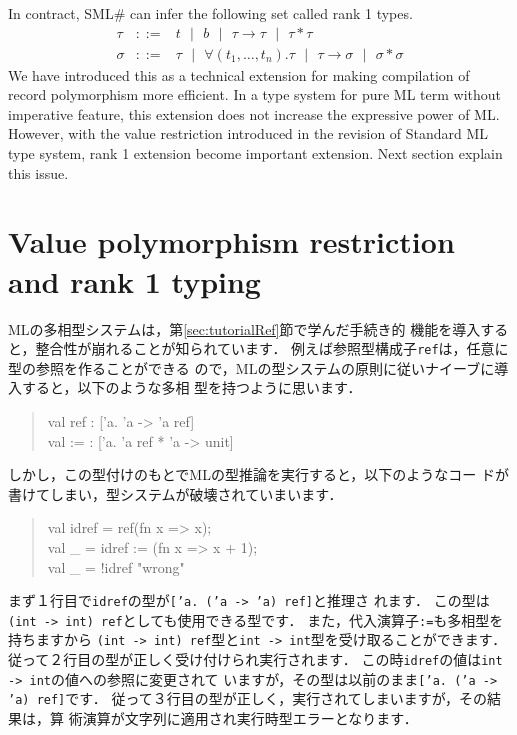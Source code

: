 \documentclass{jbook}
\newcommand{\txt}[2]{#2}
\newcommand{\smlsharp}{SML\#}
\newcommand{\func}{\rightarrow}
\newcommand{\vbar}{\mbox{\ $|$\ }}
\newenvironment{program}{\begin{quote}\begin{tt}}%
                        {\end{tt}\end{quote}}
\begin{document}
	In contract, \smlsharp{} can infer the following set called rank
1 types.
\begin{eqnarray*}
\tau &::=& t \vbar b \vbar \tau \func \tau \vbar \tau * \tau
\\
\sigma &::=& \tau \vbar \forall (t_1,\ldots,t_n).\tau 
\vbar \tau \func \sigma
\vbar \sigma * \sigma 
\end{eqnarray*}
	We have introduced this as a technical extension for making 
compilation of record polymorphism  more efficient.
	In a type system for pure ML term without imperative feature,
this extension does not increase the expressive power of ML.
	However, with the value restriction introduced in the revision
of Standard ML type system, rank 1 extension become important extension.
	Next section explain this issue.
\fi%

\section{\txt{ランク１多相性による値多相性制約の緩和}
{Value polymorphism restriction and rank 1 typing}
}
\label{sec:extensionValuerestriction}

\ifjp%
	MLの多相型システムは，第\ref{sec:tutorialRef}節で学んだ手続き的
機能を導入すると，整合性が崩れることが知られています．
	例えば参照型構成子{\tt ref}は，任意に型の参照を作ることができる
ので，MLの型システムの原則に従いナイーブに導入すると，以下のような多相
型を持つように思います．
\begin{program}
val ref : ['a. 'a -> 'a ref]\\
val := :  ['a. 'a ref * 'a -> unit]
\end{program}
	しかし，この型付けのもとでMLの型推論を実行すると，以下のようなコー
ドが書けてしまい，型システムが破壊されていまいます．
\begin{program}
val idref = ref(fn x => x);\\
val \_ = idref := (fn x => x + 1);\\
val \_ = !idref "wrong"
\end{program}
	まず１行目で{\tt idref}の型が{\tt ['a. ('a -> 'a) ref]}と推理さ
れます．
	この型は{\tt (int -> int) ref}としても使用できる型です．
	また，代入演算子{\tt :=}も多相型を持ちますから
{\tt (int -> int) ref}型と{\tt int -> int}型を受け取ることができます．
	従って２行目の型が正しく受け付けられ実行されます．
	この時{\tt idref}の値は{\tt int -> int}の値への参照に変更されて
いますが，その型は以前のまま{\tt ['a. ('a -> 'a) ref]}です．
	従って３行目の型が正しく，実行されてしまいますが，その結果は，算
術演算が文字列に適用され実行時型エラーとなります．
\end{document}
